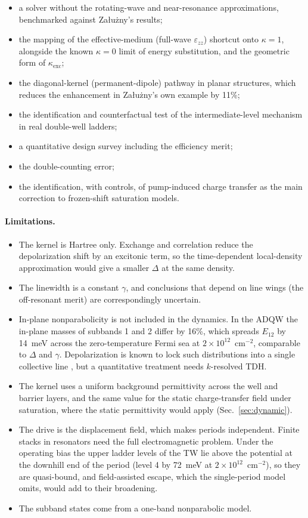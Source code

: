 \documentclass[11pt]{article}
\begin{document}
\begin{itemize}
\item a solver without the rotating-wave and near-resonance approximations, benchmarked against Załużny's results;
\item the mapping of the effective-medium (full-wave $\varepsilon_{zz}$) shortcut onto $\kappa=1$, alongside the known $\kappa=0$ limit of energy substitution, and the geometric form of $\kappa_\mathrm{exc}$;
\item the diagonal-kernel (permanent-dipole) pathway in planar structures, which reduces the enhancement in Załużny's own example by 11\%;
\item the identification and counterfactual test of the intermediate-level mechanism in real double-well ladders;
\item a quantitative design survey including the efficiency merit;
\item the double-counting error;
\item the identification, with controls, of pump-induced charge transfer as the main correction to frozen-shift saturation models.
\end{itemize}

\paragraph{Limitations.}
\begin{itemize}
\item The kernel is Hartree only. Exchange and correlation reduce the depolarization shift by an excitonic term, so the time-dependent local-density approximation would give a smaller $\Delta$ at the same density.
\item The linewidth is a constant $\gamma$, and conclusions that depend on line wings (the off-resonant merit) are correspondingly uncertain.
\item In-plane nonparabolicity is not included in the dynamics. In the ADQW the in-plane masses of subbands 1 and 2 differ by 16\%, which spreads $E_{12}$ by 14~meV across the zero-temperature Fermi sea at $2\times10^{12}$~cm$^{-2}$, comparable to $\Delta$ and $\gamma$. Depolarization is known to lock such distributions into a single collective line \cite{Warburton1996}, but a quantitative treatment needs $k$-resolved TDH.
\item The kernel uses a uniform background permittivity across the well and barrier layers, and the same value for the static charge-transfer field under saturation, where the static permittivity would apply (Sec.~\ref{sec:dynamic}).
\item The drive is the displacement field, which makes periods independent. Finite stacks in resonators need the full electromagnetic problem. Under the operating bias the upper ladder levels of the TW lie above the potential at the downhill end of the period (level 4 by 72~meV at $2\times10^{12}$~cm$^{-2}$), so they are quasi-bound, and field-assisted escape, which the single-period model omits, would add to their broadening.
\item The subband states come from a one-band nonparabolic model.
\end{itemize}
\end{document}
